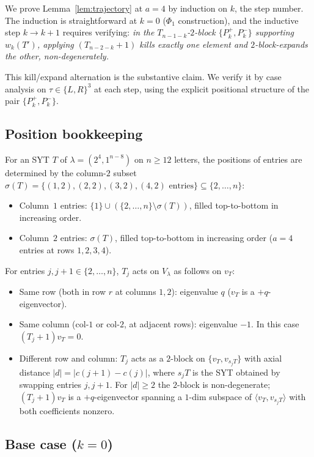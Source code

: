 \documentclass[11pt]{article}
\theoremstyle{definition}
\begin{document}
We prove Lemma~\ref{lem:trajectory} at $a=4$ by induction on $k$, the
step number.  The induction is straightforward at $k=0$ ($\Phi_1$
construction), and the inductive step $k\to k+1$ requires verifying:
\emph{in the $T_{n-1-k}$-$2$-block $\{P_k^+,P_k^-\}$ supporting
$w_k(T')$, applying $(T_{n-2-k}{+}1)$ kills exactly one element and
$2$-block-expands the other, non-degenerately.}

This kill/expand alternation is the substantive claim.  We verify it
by case analysis on $\tau\in\{L,R\}^3$ at each step, using the
explicit positional structure of the pair $\{P_k^+,P_k^-\}$.

\subsection{Position bookkeeping}\label{sec:pos}

For an SYT $T$ of $\lambda=(2^4,1^{n-8})$ on $n\ge 12$ letters, the
positions of entries are determined by the column-$2$ subset
$\sigma(T)=\{(1,2),(2,2),(3,2),(4,2)\text{ entries}\}\subseteq\{2,\ldots,n\}$:
\begin{itemize}[leftmargin=2em,topsep=0.3em,itemsep=0.2em]
\item Column~$1$ entries: $\{1\}\cup(\{2,\ldots,n\}\setminus\sigma(T))$,
filled top-to-bottom in increasing order.
\item Column~$2$ entries: $\sigma(T)$, filled top-to-bottom in
increasing order ($a=4$ entries at rows $1,2,3,4$).
\end{itemize}

For entries $j,j+1\in\{2,\ldots,n\}$, $T_j$ acts on $V_\lambda$ as
follows on $v_T$:
\begin{itemize}[leftmargin=2em,topsep=0.3em,itemsep=0.2em]
\item Same row (both in row $r$ at columns $1,2$): eigenvalue $q$
($v_T$ is a $+q$-eigenvector).
\item Same column (col-$1$ or col-$2$, at adjacent rows): eigenvalue
$-1$.  In this case $(T_j{+}1)v_T=0$.
\item Different row and column: $T_j$ acts as a $2$-block on
$\{v_T,v_{s_jT}\}$ with axial distance $|d|=|c(j+1)-c(j)|$, where
$s_jT$ is the SYT obtained by swapping entries $j,j+1$.  For $|d|\ge 2$
the $2$-block is non-degenerate; $(T_j{+}1)v_T$ is a $+q$-eigenvector
spanning a $1$-dim subspace of $\langle v_T,v_{s_jT}\rangle$ with both
coefficients nonzero.
\end{itemize}

\subsection{Base case ($k=0$)}
\end{document}
